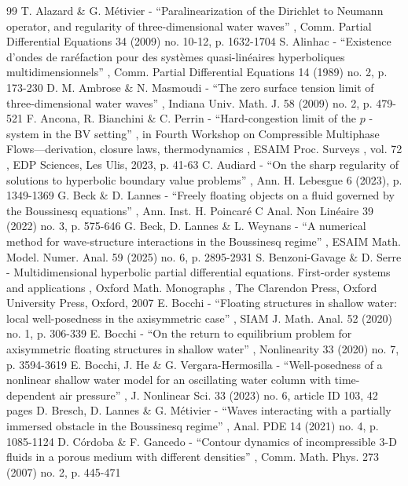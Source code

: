 \documentclass[11pt]{article}
\theoremstyle{definition}
\begin{document}
\begin{thebibliography}{99}
 T. Alazard \& G. Métivier - “Paralinearization of the Dirichlet to Neumann operator, and regularity of three-dimensional water waves” , Comm. Partial Differential Equations 34 (2009) no. 10-12, p. 1632-1704
 S. Alinhac - “Existence d’ondes de raréfaction pour des systèmes quasi-linéaires hyperboliques multidimensionnels” , Comm. Partial Differential Equations 14 (1989) no. 2, p. 173-230
 D. M. Ambrose \& N. Masmoudi - “The zero surface tension limit of three-dimensional water waves” , Indiana Univ. Math. J. 58 (2009) no. 2, p. 479-521
 F. Ancona, R. Bianchini \& C. Perrin - “Hard-congestion limit of the $p$ -system in the BV setting” , in Fourth Workshop on Compressible Multiphase Flows—derivation, closure laws, thermodynamics , ESAIM Proc. Surveys , vol. 72 , EDP Sciences, Les Ulis, 2023, p. 41-63
 C. Audiard - “On the sharp regularity of solutions to hyperbolic boundary value problems” , Ann. H. Lebesgue 6 (2023), p. 1349-1369
 G. Beck \& D. Lannes - “Freely floating objects on a fluid governed by the Boussinesq equations” , Ann. Inst. H. Poincaré C Anal. Non Linéaire 39 (2022) no. 3, p. 575-646
 G. Beck, D. Lannes \& L. Weynans - “A numerical method for wave-structure interactions in the Boussinesq regime” , ESAIM Math. Model. Numer. Anal. 59 (2025) no. 6, p. 2895-2931
 S. Benzoni-Gavage \& D. Serre - Multidimensional hyperbolic partial differential equations. First-order systems and applications , Oxford Math. Monographs , The Clarendon Press, Oxford University Press, Oxford, 2007
 E. Bocchi - “Floating structures in shallow water: local well-posedness in the axisymmetric case” , SIAM J. Math. Anal. 52 (2020) no. 1, p. 306-339
 E. Bocchi - “On the return to equilibrium problem for axisymmetric floating structures in shallow water” , Nonlinearity 33 (2020) no. 7, p. 3594-3619
 E. Bocchi, J. He \& G. Vergara-Hermosilla - “Well-posedness of a nonlinear shallow water model for an oscillating water column with time-dependent air pressure” , J. Nonlinear Sci. 33 (2023) no. 6, article ID 103, 42 pages
 D. Bresch, D. Lannes \& G. Métivier - “Waves interacting with a partially immersed obstacle in the Boussinesq regime” , Anal. PDE 14 (2021) no. 4, p. 1085-1124
 D. Córdoba \& F. Gancedo - “Contour dynamics of incompressible 3-D fluids in a porous medium with different densities” , Comm. Math. Phys. 273 (2007) no. 2, p. 445-471

\end{thebibliography}
\end{document}
